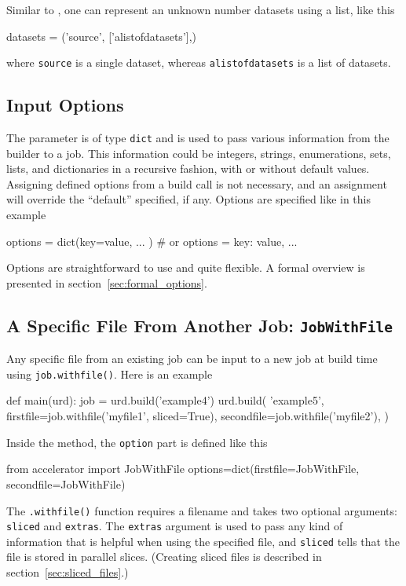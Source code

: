 Similar to \jobs, one can represent an unknown number datasets using a
list, like this
\begin{python}
datasets = ('source', ['alistofdatasets'],)
\end{python}
where \texttt{source} is a single dataset, whereas
\texttt{alistofdatasets} is a list of datasets.



\subsection{Input Options}

The \options parameter is of type \texttt{dict} and is used to pass
various information from the builder to a job.  This information could
be integers, strings, enumerations, sets, lists, and dictionaries in a
recursive fashion, with or without default values.  Assigning defined
options from a build call is not necessary, and an assignment will
override the ``default'' specified, if any.  Options are specified
like in this example
\begin{python}
  options = dict(key=value, ... )  # or
  options = {key: value, ...}
\end{python}

Options are straightforward to use and quite flexible.  A formal
overview is presented in section~\ref{sec:formal_options}.



\subsection{A Specific File From Another Job:  \texttt{JobWithFile}}
\label{sec:jobwithfile}
Any specific file from an existing job can be input to a new job at
build time using \texttt{job.withfile()}.  Here is an example
\begin{python}
def main(urd):
    job = urd.build('example4')
    urd.build(
        'example5',
        firstfile=job.withfile('myfile1', sliced=True),
        secondfile=job.withfile('myfile2'),
    )
\end{python}
Inside the method, the \texttt{option} part is defined like this
\begin{python}
from accelerator import JobWithFile
options=dict(firstfile=JobWithFile, secondfile=JobWithFile)
\end{python}
The \texttt{.withfile()} function requires a filename and takes two
optional arguments: \texttt{sliced} and \texttt{extras}.  The
\texttt{extras} argument is used to pass any kind of information that
is helpful when using the specified file, and \texttt{sliced} tells
that the file is stored in parallel slices.  (Creating sliced files is
described in section~\ref{sec:sliced_files}.)

